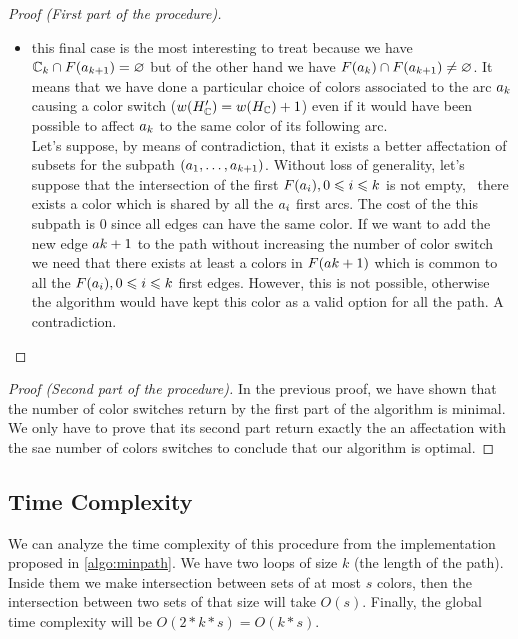 \begin{proof}[Proof (First part of the procedure)]
\begin{itemize}
\begin{itemize}
            \item this final case is the most interesting to treat because we have $\mathbb{C}_{k} \cap F(a_{k+1}) = \varnothing$ but of the other hand we have $F(a_{k}) \cap F(a_{k+1}) \neq \varnothing$. It means that we have done a particular choice of colors associated to the arc $a_k$ causing a color switch ($w(H_{\mathbb{C}}') = w(H_{\mathbb{C}}) + 1$) even if it would have been possible to affect $a_k$ to the same color of its following arc.\\
                  Let's suppose, by means of contradiction, that it exists a better affectation of subsets for the subpath $(a_1,\ldots,a_{k + 1})$. Without loss of generality, let's suppose that the intersection of the first $F(a_i), 0 \leqslant i \leqslant k$ is not empty, \ie\ there exists a color which is shared by all the $a_i$ first arcs. The cost of the this subpath is $0$ since all edges can have the same color. If we want to add the new edge $a{k + 1}$ to the path without increasing the number of color switch we need that there exists at least a colors in $F(a{k + 1})$ which is common to all the $F(a_i), 0 \leqslant i \leqslant k$ first edges. However, this is not possible, otherwise the algorithm would have kept this color as a valid option for all the path. A contradiction.
          \end{itemize}
  \end{itemize}
\end{proof}

\begin{proof}[Proof (Second part of the procedure)]
  In the previous proof, we have shown that the number of color switches return by the first part of the algorithm is minimal. We only have to prove that its second part return exactly the an affectation with the sae number of colors switches to conclude that our algorithm is optimal.

\end{proof}

\subsection{Time Complexity}

We can analyze the time complexity of this procedure from the implementation proposed in \cref{algo:minpath}. We have two loops of size $k$ (the length of the path). Inside them we make intersection between sets of at most $s$ colors, then the intersection between two sets of that size will take $O(s)$. Finally, the global time complexity will be $O(2 * k * s) = O(k*s)$.

